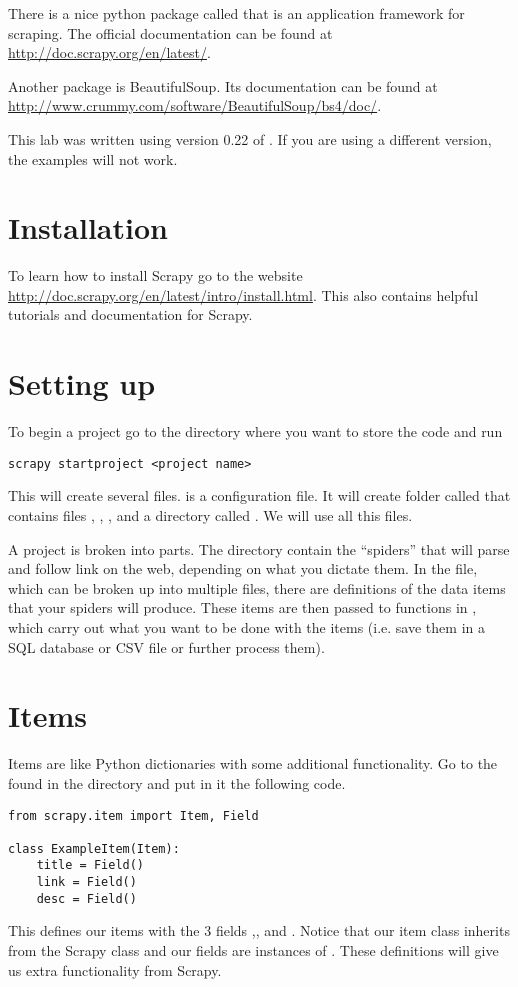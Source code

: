 There is a nice python package called  that is an application framework for scraping.
The official documentation can be found at \url{http://doc.scrapy.org/en/latest/}. 

Another package is BeautifulSoup. Its documentation can be found at \url{http://www.crummy.com/software/BeautifulSoup/bs4/doc/}.

\begin{warn}
This lab was written using version 0.22 of . 
If you are using a different version, the examples will not work.
\end{warn}

\section*{Installation}
To learn how to install Scrapy go to the website \url{http://doc.scrapy.org/en/latest/intro/install.html}. 
This also contains helpful tutorials and documentation for Scrapy.

\section*{Setting up}
To begin a project go to the directory where you want to store the code and run
\begin{lstlisting}
scrapy startproject <project name>
\end{lstlisting}
This will create several files.  is a configuration file. 
It will create folder called  that contains files , , , and a directory called . 
We will use all this files.

A  project is broken into parts. 
The  directory contain the ``spiders'' that will parse and follow link on the web, depending on what you dictate them.
In the  file, which can be broken up into multiple files, there are definitions of the data items that your spiders will produce. 
These items are then passed to functions in , which carry out what you want to be done with the items (i.e. save them in a SQL database or CSV file or further process them).

\section*{Items}
Items are like Python dictionaries with some additional functionality. 
Go to the  found in the  directory and put in it the following code.
\begin{lstlisting}
from scrapy.item import Item, Field

class ExampleItem(Item):
    title = Field()
    link = Field()
    desc = Field()
\end{lstlisting}
This defines our items with the 3 fields ,, and . 
Notice that our item class inherits from the Scrapy class  and our fields are instances of . 
These definitions will give us extra functionality from Scrapy.

